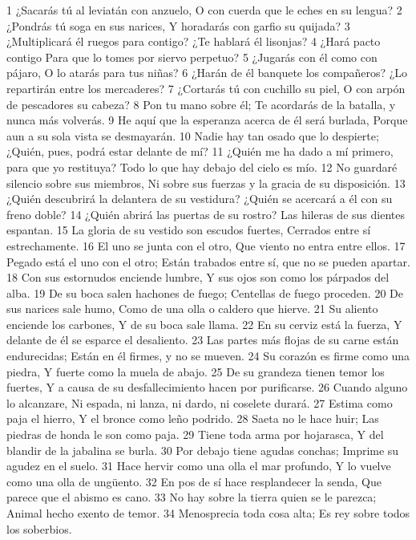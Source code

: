 1 ¿Sacarás tú al leviatán con anzuelo,  
O con cuerda que le eches en su lengua?  
2 ¿Pondrás tú soga en sus narices,  
Y horadarás con garfio su quijada?  
3 ¿Multiplicará él ruegos para contigo?  
¿Te hablará él lisonjas?  
4 ¿Hará pacto contigo  
Para que lo tomes por siervo perpetuo?  
5 ¿Jugarás con él como con pájaro,  
O lo atarás para tus niñas?  
6 ¿Harán de él banquete los compañeros?  
¿Lo repartirán entre los mercaderes?  
7 ¿Cortarás tú con cuchillo su piel,  
O con arpón de pescadores su cabeza?  
8 Pon tu mano sobre él;  
Te acordarás de la batalla, y nunca más volverás.  
9 He aquí que la esperanza acerca de él será burlada,  
Porque aun a su sola vista se desmayarán.  
10 Nadie hay tan osado que lo despierte;  
¿Quién, pues, podrá estar delante de mí?  
11 ¿Quién me ha dado a mí primero, para que yo restituya? 
Todo lo que hay debajo del cielo es mío.  
12 No guardaré silencio sobre sus miembros,  
Ni sobre sus fuerzas y la gracia de su disposición.  
13 ¿Quién descubrirá la delantera de su vestidura?  
¿Quién se acercará a él con su freno doble?  
14 ¿Quién abrirá las puertas de su rostro?  
Las hileras de sus dientes espantan.  
15 La gloria de su vestido son escudos fuertes,  
Cerrados entre sí estrechamente. 
16 El uno se junta con el otro,  
Que viento no entra entre ellos.  
17 Pegado está el uno con el otro;  
Están trabados entre sí, que no se pueden apartar.  
18 Con sus estornudos enciende lumbre,  
Y sus ojos son como los párpados del alba.  
19 De su boca salen hachones de fuego;  
Centellas de fuego proceden.  
20 De sus narices sale humo,  
Como de una olla o caldero que hierve. 
21 Su aliento enciende los carbones,  
Y de su boca sale llama.  
22 En su cerviz está la fuerza,  
Y delante de él se esparce el desaliento.  
23 Las partes más flojas de su carne están endurecidas;  
Están en él firmes, y no se mueven.  
24 Su corazón es firme como una piedra,  
Y fuerte como la muela de abajo.  
25 De su grandeza tienen temor los fuertes,  
Y a causa de su desfallecimiento hacen por purificarse. 
26 Cuando alguno lo alcanzare,  
Ni espada, ni lanza, ni dardo, ni coselete durará.  
27 Estima como paja el hierro,  
Y el bronce como leño podrido.  
28 Saeta no le hace huir;  
Las piedras de honda le son como paja.  
29 Tiene toda arma por hojarasca,  
Y del blandir de la jabalina se burla.  
30 Por debajo tiene agudas conchas;  
Imprime su agudez en el suelo.  
31 Hace hervir como una olla el mar profundo,  
Y lo vuelve como una olla de ungüento.  
32 En pos de sí hace resplandecer la senda, 
Que parece que el abismo es cano.  
33 No hay sobre la tierra quien se le parezca;  
Animal hecho exento de temor.  
34 Menosprecia toda cosa alta;  
Es rey sobre todos los soberbios.  

